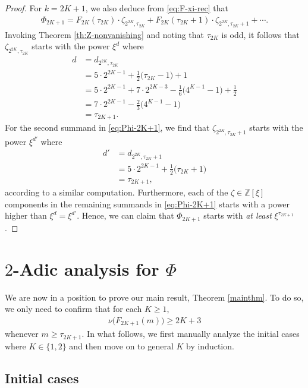 \documentclass[12pt,reqno]{amsart}
\numberwithin{equation}{section}
\theoremstyle{theorem}
\theoremstyle{definition}
\begin{document}
\begin{proof}
	For $k=2K+1$, we also deduce from \eqref{eq:F-xi-rec} that
	\begin{align}\label{eq:Phi-2K+1}
		\Phi_{2K+1} = F_{2K}(\tau_{2K}) \cdot \zeta_{2^{2K},\tau_{2K}} + F_{2K}(\tau_{2K}+1) \cdot \zeta_{2^{2K},\tau_{2K}+1} + \cdots.
	\end{align}
	Invoking Theorem \ref{th:Z-nonvanishing} and noting that $\tau_{2K}$ is odd, it follows that $\zeta_{2^{2K},\tau_{2K}}$ starts with the power $\xi^{d}$ where
	\begin{align*}
		d&=d_{2^{2K},\tau_{2K}}\\
		&=5\cdot 2^{2K-1}+\tfrac{1}{2}\big(\tau_{2K}-1\big)+1\\
		&=5\cdot 2^{2K-1}+7\cdot 2^{2K-3}-\tfrac{1}{6}\big(4^{K-1}-1\big)+\tfrac{1}{2}\\
		&=7\cdot 2^{2K-1}-\tfrac{2}{3}\big(4^{K-1}-1\big)\\
		&=\tau_{2K+1}.
	\end{align*}
	For the second summand in \eqref{eq:Phi-2K+1}, we find that $\zeta_{2^{2K},\tau_{2K}+1}$ starts with the power $\xi^{d'}$ where
	\begin{align*}
		d'&=d_{2^{2K},\tau_{2K}+1}\\
		&=5\cdot 2^{2K-1}+\tfrac{1}{2}\big(\tau_{2K}+1\big)\\
		&=\tau_{2K+1},
	\end{align*}
	according to a similar computation. Furthermore, each of the $\zeta \in \mathbb{Z}[\xi]$ components in the remaining summands in \eqref{eq:Phi-2K+1} starts with a power higher than $\xi^d=\xi^{d'}$. Hence, we can claim that $\Phi_{2K+1}$ starts with \emph{at least}  $\xi^{\tau_{2K+1}}$.
\end{proof}

\section{$2$-Adic analysis for $\Phi$}\label{sec:2-adic-Phi}

We are now in a position to prove our main result, Theorem \ref{mainthm}. To do so, we only need to confirm that for each $K\ge 1$,
\begin{align*}
	\nu\big(F_{2K+1}(m)\big)\ge 2K+3
\end{align*}
whenever $m\ge \tau_{2K+1}$. In what follows, we first manually analyze the initial cases where $K\in\{1,2\}$ and then move on to general $K$ by induction.

\subsection{Initial cases}\label{sec:Phi-2-adic-initial}
\end{document}
